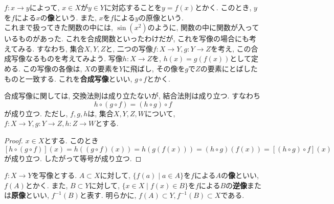         $f:x\rightarrow y$によって, $x\in X$が$y\in Y$に対応することを$y=f(x)$とかく. このとき, $y$を$f$による$x$の\textbf{像}という. また, $x$を$f$による$y$の原像という.\\

        これまで扱ってきた関数の中には, $\sin(x^2)$のように, 関数の中に関数が入っているものがあった. これを合成関数といったわけだが, これを写像の場合にも考えてみる. すなわち, 集合$X,Y,Z$と, 
        二つの写像$f:X\rightarrow Y, g:Y\rightarrow Z$を考え, この合成写像なるものを考えてみよう. 写像$h:X\rightarrow Z$を, $h(x)=g(f(x))$として定める. この写像の各像は, $X$の要素を$Y$に飛ばし, 
        その像を$g$で$Z$の要素にとばしたものと一致する. これを\textbf{合成写像}といい, $g\circ f$とかく.
        
        合成写像に関しては, 交換法則は成り立たないが, 結合法則は成り立つ. すなわち
        \begin{equation}
            h\circ (g\circ f) = (h\circ g)\circ f \label{eq:集合論基礎:合成写像の結合法則}
        \end{equation}
        が成り立つ. ただし, $f,g,h$は, 集合$X,Y,Z,W$について, $f:X\rightarrow Y, g:Y\rightarrow Z, h:Z\rightarrow W$とする.
        \begin{proof}
            $x\in X$とする. このとき\[ [h\circ (g\circ f)](x)=h((g\circ f)(x))=h(g(f(x)))=(h\circ g)(f(x))=[(h\circ g)\circ f](x)\]
            が成り立つ. したがって等号が成り立つ.
        \end{proof}
        $f:X\rightarrow Y$を写像とする. $A\subset X$に対して, $\{f(a)\mid a\in A\}$を$f$による$A$の\textbf{像}といい, $f(A)$とかく. また, $B\subset Y$に対して, 
        $\{x\in X\mid f(x)\in B\}$を$f$による$B$の\textbf{逆像}または\textbf{原像}といい, $f^{-1}(B)$と表す. 明らかに, $f(A)\subset Y,f^{-1}(B)\subset X$である.

